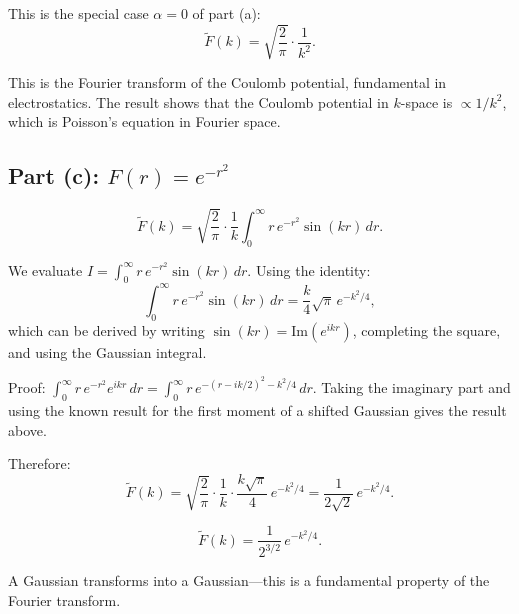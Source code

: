 \documentclass[12pt]{article}
\begin{document}
This is the special case $\alpha = 0$ of part (a):
\[
\boxed{\tilde{F}(k) = \sqrt{\frac{2}{\pi}}\cdot\frac{1}{k^2}.}
\]

This is the Fourier transform of the Coulomb potential, fundamental in electrostatics. The result shows that the Coulomb potential in $k$-space is $\propto 1/k^2$, which is Poisson's equation in Fourier space.

\subsection*{Part (c): $F(r) = e^{-r^2}$}

\[
\tilde{F}(k) = \sqrt{\frac{2}{\pi}}\cdot\frac{1}{k}\int_0^{\infty} r\,e^{-r^2}\sin(kr)\,dr.
\]

We evaluate $I = \int_0^{\infty}r\,e^{-r^2}\sin(kr)\,dr$. Using the identity:
\[
\int_0^{\infty}r\,e^{-r^2}\sin(kr)\,dr = \frac{k}{4}\sqrt{\pi}\,e^{-k^2/4},
\]
which can be derived by writing $\sin(kr) = \text{Im}(e^{ikr})$, completing the square, and using the Gaussian integral.

Proof: $\int_0^{\infty}r\,e^{-r^2}e^{ikr}\,dr = \int_0^{\infty}r\,e^{-(r-ik/2)^2-k^2/4}\,dr$. Taking the imaginary part and using the known result for the first moment of a shifted Gaussian gives the result above.

Therefore:
\[
\tilde{F}(k) = \sqrt{\frac{2}{\pi}}\cdot\frac{1}{k}\cdot\frac{k\sqrt{\pi}}{4}\,e^{-k^2/4} = \frac{1}{2\sqrt{2}}\,e^{-k^2/4}.
\]

\[
\boxed{\tilde{F}(k) = \frac{1}{2^{3/2}}\,e^{-k^2/4}.}
\]

A Gaussian transforms into a Gaussian---this is a fundamental property of the Fourier transform.
\end{document}
